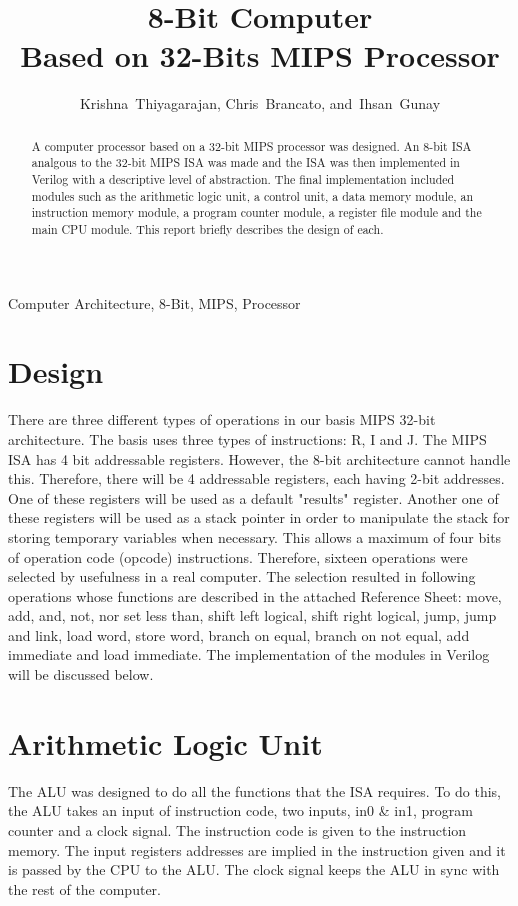 \documentclass[journal]{IEEEtran}
\begin{document}
\title{8-Bit Computer \\ Based on 32-Bits MIPS Processor}


\author{Krishna~Thiyagarajan, Chris~Brancato, and~Ihsan~Gunay}
\maketitle


\begin{abstract}
    A computer processor based on a 32-bit MIPS processor was designed. An 8-bit ISA analgous to the 32-bit MIPS ISA was made and the ISA was then implemented in Verilog with a descriptive level of abstraction. The final implementation included modules such as the arithmetic logic unit, a control unit, a data memory module, an instruction memory module, a program counter module, a register file module and the main CPU module. This report briefly describes the design of each.
\end{abstract}

\begin{IEEEkeywords}
Computer Architecture, 8-Bit, MIPS, Processor
\end{IEEEkeywords}



\section{Design}
There are three different types of operations in our basis MIPS 32-bit architecture. The basis uses three types of instructions: R, I and J. The MIPS ISA has 4 bit addressable registers. However, the 8-bit architecture cannot handle this. Therefore, there will be 4 addressable registers, each having 2-bit addresses. One of these registers will be used as a default "results" register. Another one of these registers will be used as a stack pointer in order to manipulate the stack for storing temporary variables when necessary. This allows a maximum of four bits of operation code (opcode) instructions. Therefore, sixteen operations were selected by usefulness in a real computer. The selection resulted in following operations whose functions are described in the attached Reference Sheet: move, add, and, not, nor set less than, shift left logical, shift right logical, jump, jump and link, load word, store word, branch on equal, branch on not equal, add immediate and load immediate. The implementation of the modules in Verilog will be discussed below.

\section{Arithmetic Logic Unit}
The ALU was designed to do all the functions that the ISA requires. To do this, the ALU takes an input of instruction code, two inputs, in0 \& in1, program counter and a clock signal. The instruction code is given to the instruction memory. The input registers addresses are implied in the instruction given and it is passed by the CPU to the ALU. The clock signal keeps the ALU in sync with the rest of the computer. 
\end{document}
